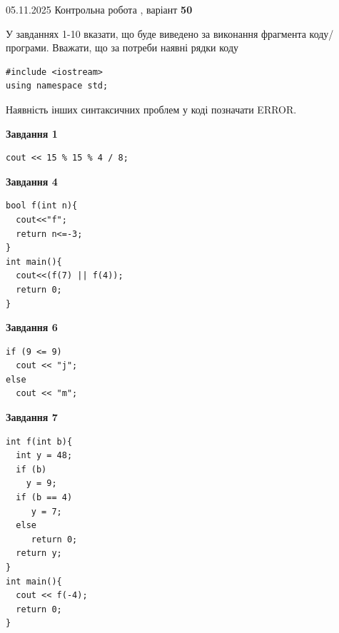 \documentclass[12pt, ukrainian]{article}
\begin{document}
\newpage

{\Large{05.11.2025 Контрольна робота , варіант  \No \textbf { 50 }\par}}
{
\begin {large}
У завданнях 1-10 вказати, що буде виведено за виконання фрагмента коду/про\-гра\-ми.
Вважати, що за потреби наявні рядки коду
\begin{verbatim}
#include <iostream>
using namespace std;
\end{verbatim}
Наявність інших синтаксичних проблем у коді позначати ERROR.

\begin{minipage}[t]{7.0cm}

\begin{center}
\textbf{Завдання 1}
\end{center}
\vspace{-8mm}

\begin{verbatim}
cout << 15 % 15 % 4 / 8;
\end{verbatim}



\begin{center}
\textbf{Завдання 4}
\end{center}
\vspace{-8mm}

\begin{verbatim}
bool f(int n){
  cout<<"f";
  return n<=-3;
}
int main(){
  cout<<(f(7) || f(4));
  return 0;
}
\end{verbatim}



\begin{center}
\textbf{Завдання 6}
\end{center}
\vspace{-8mm}

\begin{verbatim}
if (9 <= 9)
  cout << "j";
else
  cout << "m";
\end{verbatim}



\begin{center}
\textbf{Завдання 7}
\end{center}
\vspace{-8mm}

\begin{verbatim}
int f(int b){
  int y = 48;
  if (b)
    y = 9;
  if (b == 4)
     y = 7;
  else
     return 0;
  return y;
}
int main(){
  cout << f(-4);
  return 0;
}
\end{verbatim}


\end{minipage}
\end{large}}
\end{document}
